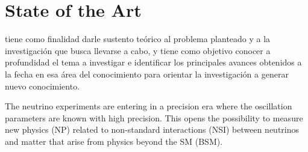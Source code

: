 \documentclass[a4paper,10pt,epsfig,epsf,amsfonts,amsmath]{article}
\begin{document}
\section{State of the Art}
\begin{colciencias}
  tiene como finalidad darle sustento teórico al problema planteado y a
la investigación que busca llevarse a cabo, y tiene como objetivo conocer a
profundidad el tema a investigar e identificar los principales avances obtenidos a la
fecha en esa área del conocimiento para orientar la investigación a generar nuevo
conocimiento.
\end{colciencias}
The neutrino experiments are entering in a precision era where the oscillation parameters are
known with high precision. This opens the possibility to measure new physics (NP) related to non-standard interactions (NSI) 
between neutrinos and matter that arise from physics beyond the SM (BSM).
\end{document}
